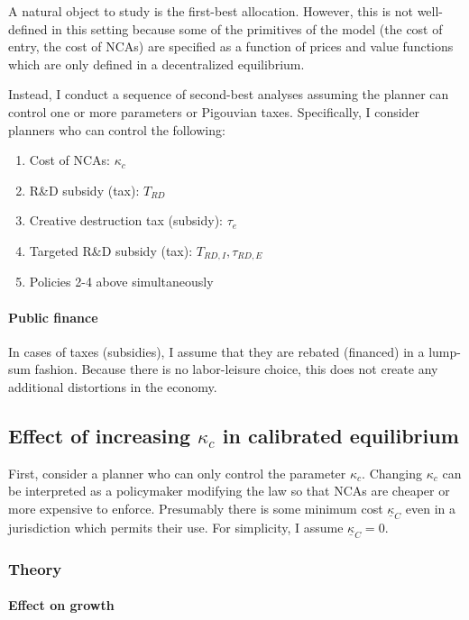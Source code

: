 \documentclass[11pt,english]{article}
\theoremstyle{remark}
\begin{document}
A natural object to study is the first-best allocation. However, this is not well-defined in this setting because some of the primitives of the model (the cost of entry, the cost of NCAs) are specified as a function of prices and value functions which are only defined in a decentralized equilibrium.

Instead, I conduct a sequence of second-best analyses assuming the planner can control one or more parameters or Pigouvian taxes. Specifically, I consider planners who can control the following: 

\begin{enumerate}
	\item Cost of NCAs: $\kappa_c$ 
	\item R\&D subsidy (tax): $T_{RD}$
	\item Creative destruction tax (subsidy): $\tau_e$
	\item Targeted R\&D subsidy (tax): $T_{RD,I}, \tau_{RD,E}$
	\item Policies 2-4 above simultaneously
\end{enumerate}

\paragraph{Public finance} 

In cases of taxes (subsidies), I assume that they are rebated (financed) in a lump-sum fashion. Because there is no labor-leisure choice, this does not create any additional distortions in the economy. 

\subsection{Effect of increasing $\kappa_c$ in calibrated equilibrium} 

First, consider a planner who can only control the parameter $\kappa_c$. Changing $\kappa_c$ can be interpreted as a policymaker modifying the law so that NCAs are cheaper or more expensive to enforce. Presumably there is some minimum cost $\underline{\kappa}_C$ even in a jurisdiction which permits their use. For simplicity, I assume $\underline{\kappa}_C = 0$.


\subsubsection{Theory}

\paragraph{Effect on growth}
\end{document}
